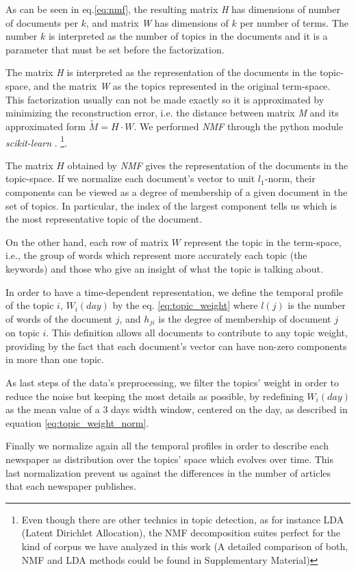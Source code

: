 \documentclass[a4paper, 12pt]{article}
\begin{document}
\par As can be seen in eq.\ref{eq:nmf}, the resulting matrix \emph{H} has dimensions of number of documents per $k$, and matrix \emph{W} has dimensions of $k$ per number of terms. The number $k$ is interpreted as the number of topics in the documents and it is a parameter that must be set before the factorization.

  \par The matrix \emph{H} is interpreted as the representation of the documents in the topic-space, and the matrix \emph{W} as the topics represented in the original term-space. This factorization usually can not be made exactly so it is approximated by minimizing the reconstruction error, i.e. the distance between matrix \emph{M} and its approximated form $\tilde{M} = H \cdot W$. We performed \emph{NMF} through the python module \emph{scikit-learn} \cite{scikit-learn}.  \footnote{ Even though there are other technics in topic detection, as for instance LDA (Latent Dirichlet Allocation), the NMF decomposition suites perfect for the kind of corpus we  have analyzed in this work (A detailed comparison of both, NMF and LDA methods could be found in Supplementary Material)}. 

\par The matrix $H$ obtained by \textit{NMF} gives the representation of the documents in the topic-space. If we normalize each document's vector to unit $l_1$-norm, their components can be viewed as a degree of membership of a given document in the set of topics. In particular, the index of the largest component tells us which is the most representative topic of the document.
\par On the other hand, each row of matrix $W$ represent the topic in the term-space, i.e., the group of words which represent more accurately each topic (the keywords) and those who give an insight of what the topic is talking about.

\par In order to have a time-dependent representation, we define the temporal profile of the topic $i$, $W_i(day)$ by the eq. \ref{eq:topic_weight} where $l(j)$ is the number of words of the document $j$, and $h_{ji}$ is the degree of membership of document $j$ on topic $i$. This definition allows all documents to contribute to any topic weight, providing by the fact that each document's vector can have non-zero components in more than one topic.
\par As last steps of the data's preprocessing, we filter the topics' weight in order to reduce the noise but keeping the most details as possible, by redefining $W_i(day)$ as the mean value of a 3 days width window, centered on the day, as described in equation \ref{eq:topic_weight_norm}. 
\par Finally we normalize again all the temporal profiles in order to describe each newspaper as distribution over the topics' space which evolves over time. This last normalization prevent us against the differences in the number of articles that each newspaper publishes.
\end{document}
